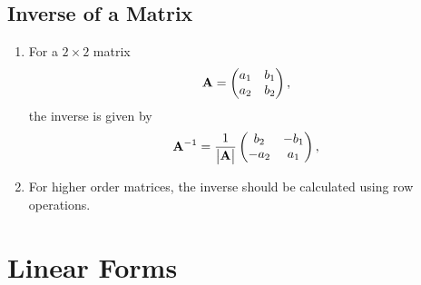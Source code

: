 \documentclass[journal,12pt,twocolumn]{IEEEtran}
\renewcommand\thesection{\arabic{section}}
\renewcommand\thesubsection{\thesection.\arabic{subsection}}
\begin{document}
\subsection{Inverse of a Matrix}
\renewcommand{\theequation}{\theenumi}
\begin{enumerate}[label=\thesubsection.\arabic*.,ref=\thesubsection.\theenumi]
\item For a $2 \times 2$ matrix 
\begin{align}
	\mathbf{A} = \begin{pmatrix}a_1 & b_1  \\ a_2 & b_2 \end{pmatrix},
\end{align}
the inverse is given by 
\begin{align}
	\mathbf{A}^{-1} = \frac{1}{\begin{vmatrix}\mathbf{A}\end{vmatrix}}\begin{pmatrix}b_2 & -b_1  \\ -a_2 & a_1 \end{pmatrix},
\end{align}
\item For higher order matrices, the inverse should be calculated using row operations.
\end{enumerate}
\section{Linear Forms}
\end{document}
